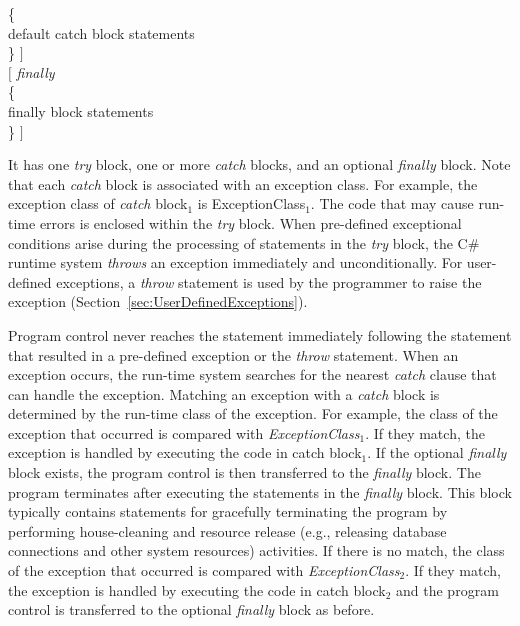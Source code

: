 {\hspace*{0.5in} \{\\
\hspace*{0.5in} \hspace*{0.2in} default catch block statements\\
\hspace*{0.5in} \}  $]$ \\
\hspace*{0.5in} $[$ \emph{finally}\\
\hspace*{0.5in} \{\\
\hspace*{0.5in} \hspace*{0.2in} finally block statements\\
\hspace*{0.5in} \} $]$

}

It has one \emph{try} block, one or more \emph{catch} blocks, and
an optional \emph{finally} block. Note that each \emph{catch}
block is associated with an exception class. For example, the
exception class of \emph{catch} block$_1$ is ExceptionClass$_1$.
The code that may cause run-time errors is enclosed within the
\emph{try} block. When pre-defined exceptional conditions arise
during the processing of statements in the \emph{try} block, the
C\# runtime system \emph{throws} an exception immediately and
unconditionally. For user-defined exceptions, a \emph{throw}
statement is used by the programmer to raise the exception
(Section~\ref{sec:UserDefinedExceptions}).

Program control never reaches the statement immediately following
the statement that resulted in a pre-defined exception or the
\emph{throw} statement. When an exception occurs, the run-time
system searches for the nearest \emph{catch} clause that can
handle the exception. Matching an exception with a \emph{catch}
block is determined by the run-time class of the exception. For
example, the class of the exception that occurred is compared with
\emph{ExceptionClass}$_1$. If they match, the exception is handled
by executing the code in catch block$_1$. If the optional
\emph{finally} block exists, the program control is then
transferred to the \emph{finally} block. The program terminates
after executing the statements in the \emph{finally} block. This
block typically contains statements for gracefully terminating the
program by performing house-cleaning and resource release (e.g.,
releasing database connections and other system resources)
activities. If there is no match, the class of the exception that
occurred is compared with \emph{ExceptionClass}$_2$. If they
match, the exception is handled by executing the code in catch
block$_2$ and the program control is transferred to the optional
\emph{finally} block as before.



